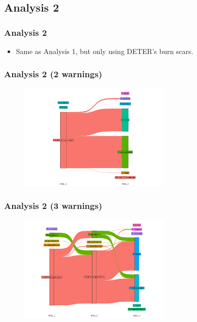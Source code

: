\documentclass[aspectratio=169]{beamer}
\begin{document}
\subsection{Analysis 2}

\begin{frame}
    \frametitle{Analysis 2}
    \begin{itemize}
        \item Same as Analysis 1, but only using DETER's burn scars.
    \end{itemize}
\end{frame}

\begin{frame}
    \frametitle{Analysis 2 (2 warnings) }
    \begin{figure}[h] 
    \includegraphics[width=0.65\textwidth]{./figures/an2_plot_deter_prodes_subarea_trajectory_2.png}
    \end{figure}
\end{frame}

\begin{frame}
    \frametitle{Analysis 2 (3 warnings) }
    \begin{figure}[h] 
    \includegraphics[width=0.65\textwidth]{./figures/an2_plot_deter_prodes_subarea_trajectory_3.png}
    \end{figure}
\end{frame}
\end{document}
